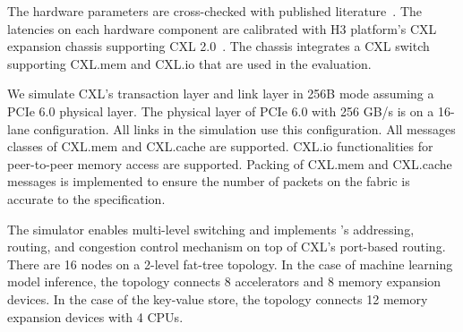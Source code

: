 The hardware parameters are cross-checked with published literature~\cite{pond:asplos:2023, demystifying-cxl:micro:2023, h3platform-cxl-memory}. 
%
The latencies on each hardware component are calibrated with H3 platform's CXL expansion chassis supporting CXL 2.0~\cite{h3platform-cxl-memory}. 
%
The chassis integrates a CXL switch~\cite{xconn-cxl2-switch} supporting CXL.mem and CXL.io that are used in the evaluation.

We simulate CXL's transaction layer and link layer in 256B mode assuming a PCIe 6.0 physical layer.
%
The physical layer of PCIe 6.0 with 256 GB/s is on a 16-lane configuration. 
%
All links in the simulation use this configuration.
%
All messages classes of CXL.mem and CXL.cache are supported.  
%
CXL.io functionalities for peer-to-peer memory access are supported. 
%
Packing of CXL.mem and CXL.cache messages is implemented to ensure the number of packets on the fabric is accurate to the specification.

The simulator enables multi-level switching and implements \aurelia's addressing, routing, and congestion control mechanism on top of CXL's port-based routing.
%
There are 16 nodes on a 2-level fat-tree topology. 
%
In the case of machine learning model inference, the topology connects 8 accelerators and 8 memory expansion devices.
%
In the case of the key-value store, the topology connects 12 memory expansion devices with 4 CPUs.
  
%
